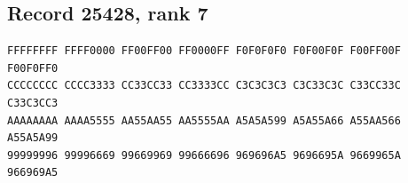 \documentclass[11pt]{amsart}
\theoremstyle{definition}
\theoremstyle{remark}
\numberwithin{equation}{section}
\numberwithin{table}{section}
\begin{document}
\subsection*{Record 25428, rank 7}
\begin{Verbatim}[fontsize=\scriptsize,xleftmargin=1em]
FFFFFFFF FFFF0000 FF00FF00 FF0000FF F0F0F0F0 F0F00F0F F00FF00F F00F0FF0
CCCCCCCC CCCC3333 CC33CC33 CC3333CC C3C3C3C3 C3C33C3C C33CC33C C33C3CC3
AAAAAAAA AAAA5555 AA55AA55 AA5555AA A5A5A599 A5A55A66 A55AA566 A55A5A99
99999996 99996669 99669969 99666696 969696A5 9696695A 9669965A 966969A5
\end{Verbatim}
\par
{}\par
\end{document}

